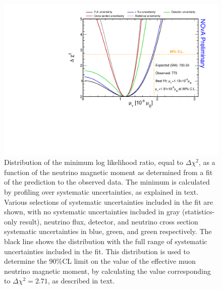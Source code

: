 \begin{figure}[hbtp]
\centering
\includegraphics[width=\textwidth]{Plots/NuMM/NuMMLimit_FinalMoneyPlot.pdf}
\caption[Distribution of the minimum log likelihood ratio as a function of the neutrino magnetic moment]{Distribution of the minimum log likelihood ratio, equal to $\Delta\chi^2$, as a function of the neutrino magnetic moment as determined from a fit of the prediction to the observed data. The minimum is calculated by profiling over systematic uncertainties, as explained in text. Various selections of systematic uncertainties included in the fit are shown, with no systematic uncertainties included in gray (statistics-only result), neutrino flux, detector, and neutrino cross section systematic uncertainties in blue, green, and green respectively. The black line shows the distribution with the full range of systematic uncertainties included in the fit. This distribution is used to determine the $90\%$\gls{CL} limit on the value of the effective muon neutrino magnetic moment, by calculating the value corresponding to $\Delta\chi^2=2.71$, as described in text.}
\label{fig:NuMMResults_ChisqLimit}
\end{figure}


